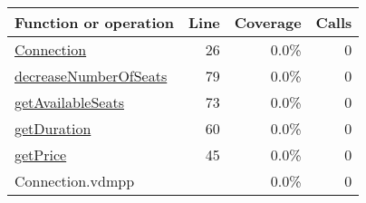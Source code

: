 \bigskip
\begin{longtable}{|l|r|r|r|}
\hline
Function or operation & Line & Coverage & Calls \\
\hline
\hline
\hyperref[Connection:26]{Connection} & 26&0.0\% & 0 \\
\hline
\hyperref[decreaseNumberOfSeats:79]{decreaseNumberOfSeats} & 79&0.0\% & 0 \\
\hline
\hyperref[getAvailableSeats:73]{getAvailableSeats} & 73&0.0\% & 0 \\
\hline
\hyperref[getDuration:60]{getDuration} & 60&0.0\% & 0 \\
\hline
\hyperref[getPrice:45]{getPrice} & 45&0.0\% & 0 \\
\hline
\hline
Connection.vdmpp & & 0.0\% & 0 \\
\hline
\end{longtable}


